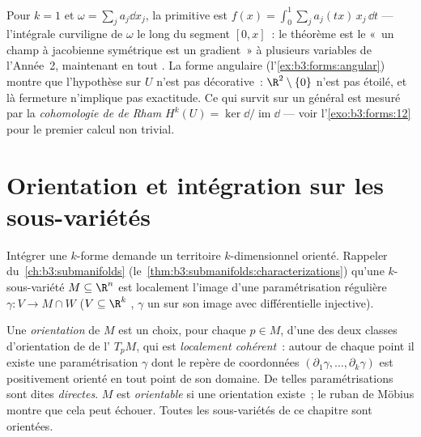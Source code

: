 \begin{remark}
Pour $k = 1$ et $\omega = \sum_j a_j\dd x_j$, la primitive
est $f(x) = \int_0^1\sum_ja_j(tx)\,x_j\,\dd t$ ---
l'intégrale curviligne de $\omega$ le long du segment $[0,
x]$~: le théorème est le «~un champ à jacobienne symétrique
est un gradient~» à plusieurs variables de l'Année~2,
maintenant en tout . La forme angulaire
(l'\cref{ex:b3:forms:angular}) montre que l'hypothèse sur $U$
n'est pas décorative~: $\R^2\setminus\{0\}$ n'est pas
étoilé, et là fermeture n'implique pas exactitude. Ce qui
survit sur un  général est mesuré par la
\emph{cohomologie de de Rham} $H^k(U) =
\ker\dd/\operatorname{im}\dd$ --- voir
l'\cref{exo:b3:forms:12} pour le premier calcul non trivial.
\end{remark}

\section{Orientation et intégration sur les sous-variétés}

Intégrer une $k$-forme demande un territoire $k$-dimensionnel
orienté. Rappeler du~\cref{ch:b3:submanifolds}
(le~\cref{thm:b3:submanifolds:characterizations}) qu'une
$k$-sous-variété $M \subseteq \R^n$ est localement l'image
d'une paramétrisation régulière $\gamma\colon V \to M \cap
W$ ($V \subseteq \R^k$ , $\gamma$ un  sur
son image avec différentielle injective).

\begin{definition}\label{def:b3:forms:orientation}
Une \emph{orientation} de $M$ est un
choix, pour chaque $p \in M$, d'une des deux classes
d'orientation de  de l' $T_pM$, qui est
\emph{localement cohérent}~: autour de chaque point il existe
une paramétrisation $\gamma$ dont le repère de coordonnées
$(\partial_1\gamma, \dots, \partial_k\gamma)$ est
positivement orienté en tout point de son domaine. De telles
paramétrisations sont dites \emph{directes}. $M$ est
\emph{orientable} si une orientation existe~; le ruban de
Möbius montre que cela peut échouer. Toutes les sous-variétés
de ce chapitre sont orientées.
\end{definition}

